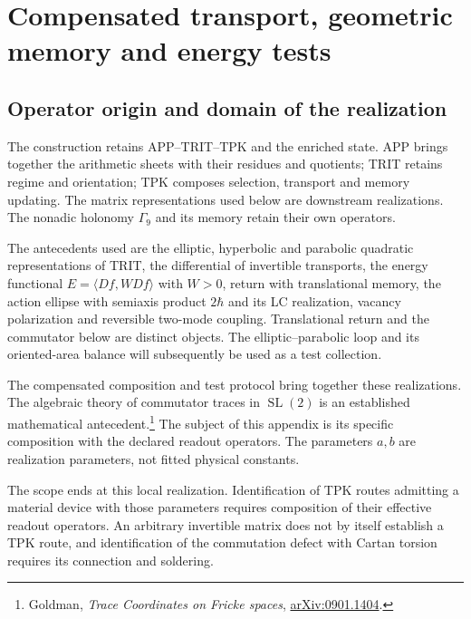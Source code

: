 \section{Compensated transport, geometric memory and energy tests}
\label{md:aux:transporte}

\subsection{Operator origin and domain of the realization}
\label{md:aux:origen}

The construction retains APP--TRIT--TPK and the enriched state.
APP brings together the arithmetic sheets with their residues and
quotients; TRIT retains regime and orientation; TPK composes selection,
transport and memory updating. The matrix representations used below
are downstream realizations. The nonadic holonomy $\Gamma_9$ and its
memory retain their own operators.

The antecedents used are the elliptic, hyperbolic and parabolic
quadratic representations of TRIT, the differential of invertible
transports, the energy functional $E=\langle Df,WDf\rangle$ with
$W>0$, return with translational memory, the action ellipse with
semiaxis product $2\hbar$ and its LC realization, vacancy polarization
and reversible two-mode coupling. Translational return and the
commutator below are distinct objects. The elliptic--parabolic loop
and its oriented-area balance will subsequently be used as a test
collection.

The compensated composition and test protocol bring together these
realizations. The algebraic theory of commutator traces in
$\operatorname{SL}(2)$ is an established mathematical
antecedent.\footnote{Goldman, \emph{Trace Coordinates on
Fricke spaces}, \href{https://arxiv.org/abs/0901.1404}{arXiv:0901.1404}.}
The subject of this appendix is its specific composition with the
declared readout operators. The parameters $a,b$ are realization
parameters, not fitted physical constants.

The scope ends at this local realization. Identification of TPK routes
admitting a material device with those parameters requires composition
of their effective readout operators. An arbitrary invertible matrix
does not by itself establish a TPK route, and identification of the
commutation defect with Cartan torsion requires its connection and
soldering.


